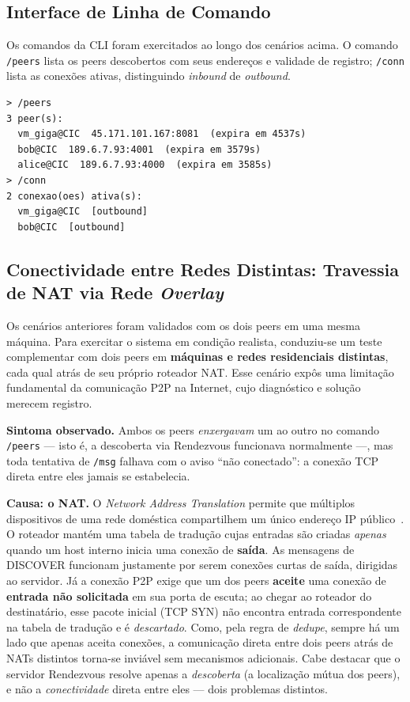 \documentclass[12pt, a4paper]{article}
\begin{document}
\subsection{Interface de Linha de Comando}
Os comandos da CLI foram exercitados ao longo dos cenários acima. O comando \texttt{/peers} lista os peers descobertos com seus endereços e validade de registro; \texttt{/conn} lista as conexões ativas, distinguindo \textit{inbound} de \textit{outbound}.

\begin{lstlisting}[style=terminal]
> /peers
3 peer(s):
  vm_giga@CIC  45.171.101.167:8081  (expira em 4537s)
  bob@CIC  189.6.7.93:4001  (expira em 3579s)
  alice@CIC  189.6.7.93:4000  (expira em 3585s)
> /conn
2 conexao(oes) ativa(s):
  vm_giga@CIC  [outbound]
  bob@CIC  [outbound]
\end{lstlisting}

\subsection{Conectividade entre Redes Distintas: Travessia de NAT via Rede \textit{Overlay}}
\label{subsec:nat}
Os cenários anteriores foram validados com os dois peers em uma mesma máquina. Para exercitar o sistema em condição realista, conduziu-se um teste complementar com dois peers em \textbf{máquinas e redes residenciais distintas}, cada qual atrás de seu próprio roteador NAT. Esse cenário expôs uma limitação fundamental da comunicação P2P na Internet, cujo diagnóstico e solução merecem registro.

\textbf{Sintoma observado.} Ambos os peers \textit{enxergavam} um ao outro no comando \texttt{/peers} --- isto é, a descoberta via Rendezvous funcionava normalmente ---, mas toda tentativa de \texttt{/msg} falhava com o aviso ``não conectado'': a conexão TCP direta entre eles jamais se estabelecia.

\textbf{Causa: o NAT.} O \textit{Network Address Translation} permite que múltiplos dispositivos de uma rede doméstica compartilhem um único endereço IP público~\cite{kurose}. O roteador mantém uma tabela de tradução cujas entradas são criadas \textit{apenas} quando um host interno inicia uma conexão de \textbf{saída}. As mensagens de DISCOVER funcionam justamente por serem conexões curtas de saída, dirigidas ao servidor. Já a conexão P2P exige que um dos peers \textbf{aceite} uma conexão de \textbf{entrada não solicitada} em sua porta de escuta; ao chegar ao roteador do destinatário, esse pacote inicial (TCP SYN) não encontra entrada correspondente na tabela de tradução e é \textit{descartado}. Como, pela regra de \textit{dedupe}, sempre há um lado que apenas aceita conexões, a comunicação direta entre dois peers atrás de NATs distintos torna-se inviável sem mecanismos adicionais. Cabe destacar que o servidor Rendezvous resolve apenas a \textit{descoberta} (a localização mútua dos peers), e não a \textit{conectividade} direta entre eles --- dois problemas distintos.
\end{document}
